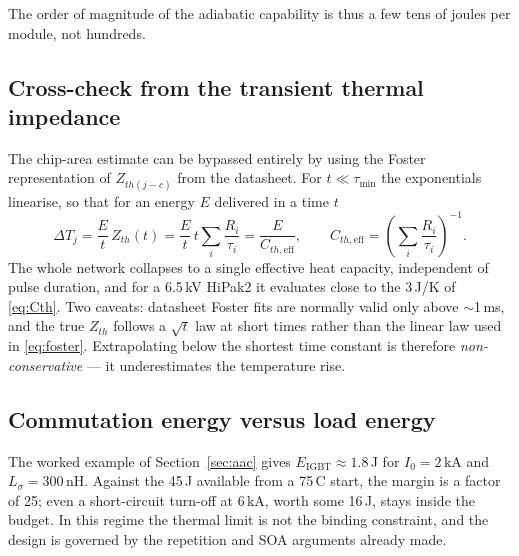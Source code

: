\documentclass[11pt,a4paper]{article}
\begin{document}
The order of magnitude of the adiabatic capability is thus a few tens of
joules per module, not hundreds.

\subsection{Cross-check from the transient thermal impedance}

The chip-area estimate can be bypassed entirely by using the Foster
representation of $Z_{th(j-c)}$ from the datasheet. For
$t \ll \tau_{\min}$ the exponentials linearise, so that for an energy
$E$ delivered in a time $t$
%
\begin{equation}
  \Delta T_j = \frac{E}{t}\,Z_{th}(t)
  = \frac{E}{t}\,t\sum_i\frac{R_i}{\tau_i}
  = \frac{E}{C_{th,\mathrm{eff}}},
  \qquad
  C_{th,\mathrm{eff}} = \left(\sum_i\frac{R_i}{\tau_i}\right)^{-1} .
  \label{eq:foster}
\end{equation}
%
The whole network collapses to a single effective heat capacity,
independent of pulse duration, and for a 6.5\,kV HiPak2 it evaluates
close to the 3\,J/K of \eqref{eq:Cth}. Two caveats: datasheet Foster
fits are normally valid only above $\sim$1\,ms, and the true $Z_{th}$
follows a $\sqrt{t}$ law at short times rather than the linear law used
in \eqref{eq:foster}. Extrapolating below the shortest time constant is
therefore \emph{non-conservative} --- it underestimates the temperature
rise.

\subsection{Commutation energy versus load energy}
\label{sec:budget}

The worked example of Section~\ref{sec:aac} gives
$E_{\mathrm{IGBT}}\approx1.8$\,J for $I_0 = 2$\,kA and
$L_\sigma = 300$\,nH. Against the 45\,J available from a
75\,\textdegree C start, the margin is a factor of 25; even a
short-circuit turn-off at 6\,kA, worth some 16\,J, stays inside the
budget. In this regime the thermal limit is not the binding constraint,
and the design is governed by the repetition and SOA arguments already
made.
\end{document}
